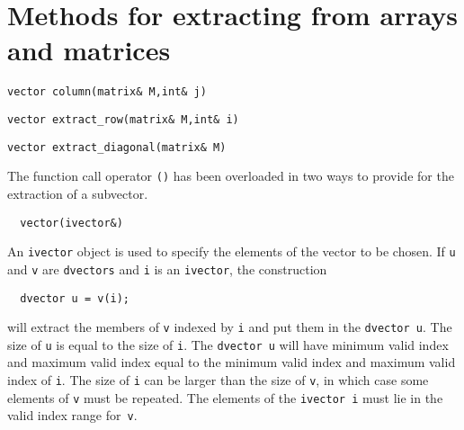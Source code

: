 \section{Methods for extracting from arrays and matrices}

\begin{lstlisting}
vector column(matrix& M,int& j)
\end{lstlisting}


\begin{lstlisting}
vector extract_row(matrix& M,int& i)
\end{lstlisting}

\begin{lstlisting}
vector extract_diagonal(matrix& M)
\end{lstlisting}

The function call operator \texttt{()} has been overloaded in two ways to
provide for the extraction of a subvector. 
 {}
\begin{lstlisting}
  vector(ivector&)
\end{lstlisting}
An \texttt{ivector} object is
used to specify the elements of the vector to be chosen. If 
\texttt{u} and \texttt{v} are \texttt{dvectors}  and \texttt{i} is an \texttt{ivector},
the construction
\begin{lstlisting}
  dvector u = v(i);
\end{lstlisting}
will extract the members of \texttt{v} indexed by \texttt{i} and put them in the
\texttt{dvector u}. The size of \texttt{u}
is equal to the size of \texttt{i}. The \texttt{dvector u} will have
minimum valid index and maximum valid index equal to the minimum
valid index and maximum valid index of \texttt{i}. 
The size of \texttt{i} can be larger than the size of \texttt{v},
in which case some elements of \texttt{v} must be repeated. The elements of
the \texttt{ivector i} must lie in the valid index range for~\texttt{v}. 

